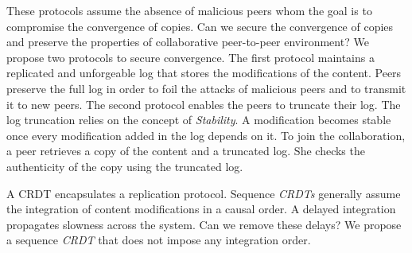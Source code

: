 \begin{ThesisAbstract}
\begin{EnglishAbstract}
These protocols assume the absence of malicious peers whom the goal is to compromise the convergence of copies.
Can we secure the convergence of copies and preserve the properties of collaborative peer-to-peer environment?
We propose two protocols to secure convergence.
The first protocol maintains a replicated and unforgeable log that stores the modifications of the content.
Peers preserve the full log in order to foil the attacks of malicious peers and to transmit it to new peers.
The second protocol enables the peers to truncate their log.
The log truncation relies on the concept of \emph{Stability}.
A modification becomes stable once every modification added in the log depends on it.
To join the collaboration, a peer retrieves a copy of the content and a truncated log.
She checks the authenticity of the copy using the truncated log.

A \acf{CRDT} encapsulates a replication protocol.
Sequence \emph{CRDTs} generally assume the integration of content modifications in a causal order.
A delayed integration propagates slowness across the system.
Can we remove these delays?
We propose a sequence \emph{CRDT} that does not impose any integration order.

\end{EnglishAbstract}
\end{ThesisAbstract}





